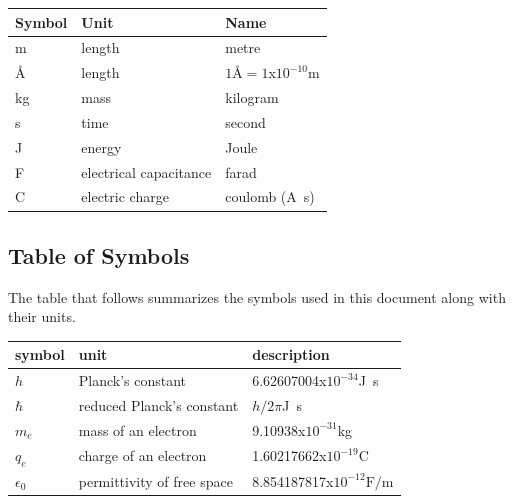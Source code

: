 \documentclass[12pt]{article}
\begin{document}
\renewcommand{\arraystretch}{1.2}
  \noindent \begin{tabular}{l l l} 
    \toprule		
    \textbf{Symbol} & \textbf{Unit} & \textbf{Name}\\
    \midrule 
    \si{\metre} & length & metre\\
    \si{\angstrom} & length & $1\si{\angstrom} = 1$x$10^{-10}$\si{\metre} \\
    \si{\kilogram} & mass	& kilogram\\
    \si{\second} & time & second\\
    \si{\joule} & energy & Joule\\
    \si{\farad} & electrical capacitance & farad \\
    \si{\coulomb} & electric charge & coulomb (\si{\ampere\second}) \\
    \bottomrule
  \end{tabular}

 

\subsection{Table of Symbols}

The table that follows summarizes the symbols used in this document along with
their units.



\renewcommand{\arraystretch}{1.2}
\noindent \begin{longtable*}{l l p{12cm}} \toprule
	\textbf{symbol} & \textbf{unit} & \textbf{description}\\
	\midrule 
	$h$ & Planck's constant & 6.62607004x$10^{-34}$\si{\joule\second} \\
	$\hbar$ & reduced Planck's constant & $h/2\pi$\si{\joule\second} \\
	$m_e$ & mass of an electron & 9.10938x$10^{-31}$\si{\kilogram} \\
	$q_e$ & charge of an electron & 1.60217662x$10^{-19}$\si{\coulomb} \\
	$\epsilon_0$ & permittivity of free space  & 8.854187817x$10^{−12} 
	\si{\farad/\metre}$ \\

	\bottomrule
\end{longtable*}
\end{document}
